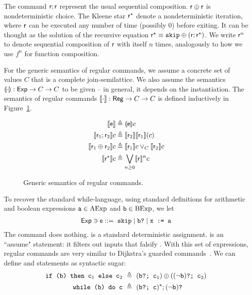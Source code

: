 The command $\mathsf{r}; \mathsf{r}$ represent the usual sequential composition. $\mathsf{r} \oplus \mathsf{r}$ is nondeterministic choice. The Kleene star $\mathsf{r}^\star$ denote a nondeterministic iteration, where $\mathsf{r}$ can be executed any number of time (possibly 0) before exiting. It can be thought as the solution of the recursive equation $\mathsf{r}^\star \equiv \texttt{skip} \oplus (\mathsf{r}; \mathsf{r}^{\star})$.
We write $\mathsf{r}^n$ to denote sequential composition of $\mathsf{r}$ with itself $n$ times, analogously to how we use $f^n$ for function composition.

For the generic semantics of regular commands, we assume a concrete set of values $C$ that is a complete join-semilattice. We also assume the semantics $\llparenthesis\cdot\rrparenthesis : \mathsf{Exp} \rightarrow C \rightarrow C$ to be given -- in general, it depends on the instantiation.
The semantics of regular commands $\llbracket\cdot\rrbracket : \mathsf{Reg} \rightarrow C \rightarrow C$ is defined inductively in Figure~\ref{fig:bg:regcom-sem}.
\begin{figure}[t]
	\begin{align*}
		\llbracket\mathsf{e}\rrbracket &\triangleq \llparenthesis\mathsf{e}\rrparenthesis c \\
		\llbracket\mathsf{r}_1 ; \mathsf{r}_2 \rrbracket c &\triangleq \llbracket\mathsf{r}_2\rrbracket\llbracket\mathsf{r}_1\rrbracket (c) \\
		\llbracket\mathsf{r}_1 \oplus \mathsf{r}_2\rrbracket c &\triangleq \llbracket\mathsf{r}_1\rrbracket c \vee_C \llbracket\mathsf{r}_2\rrbracket c \\
		\llbracket\mathsf{r}^\star\rrbracket c &\triangleq \bigvee_{n \ge 0} \llbracket\mathsf{r}\rrbracket^n c
	\end{align*}
	\caption{Generic semantics of regular commands.}
	\label{fig:bg:regcom-sem}
\end{figure}

To recover the standard while-language, using standard definitions for arithmetic and boolean expressions $\texttt{a} \in \text{AExp}$ and $\texttt{b} \in \text{BExp}$, we let
\begin{align*}
	\mathsf{Exp} \ni \mathsf{e} ::= \; \texttt{skip} \mid \texttt{b?} \mid \texttt{x := a}
\end{align*}
The command  does nothing.  is a standard deterministic assignment.  is an ``assume" statement: it filters out inputs that falsify .
With this set of expressions, regular commands are very similar to Dijkstra's guarded commands~\cite{EWD472}.
We can define  and  statements as syntactic sugar:
\begin{align*}
	\code{if (b) then } \code{c}_1 \code{ else } \code{c}_2 & \ \eqdef\  (\code{b?; c}_1) \regplus ((\lnot \code{b})\code{?; c}_2) \\
	\code{while (b) do c} & \ \eqdef\  (\code{b?; c})^\kstar; (\lnot \code{b})\code{?}
\end{align*}


